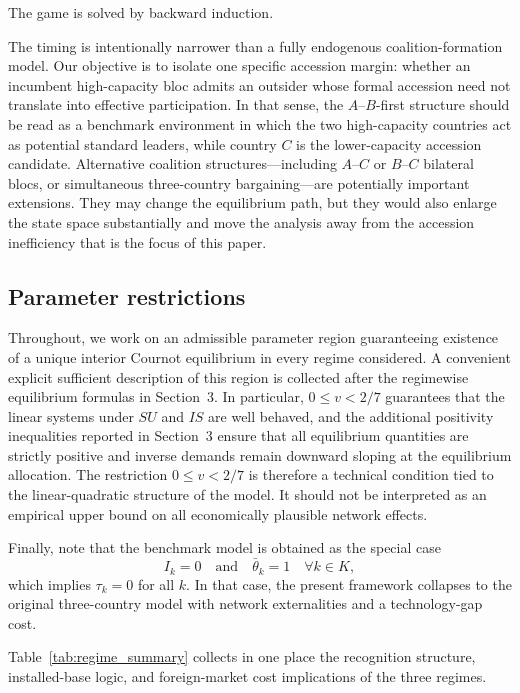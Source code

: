 The game is solved by backward induction.

The timing is intentionally narrower than a fully endogenous
coalition-formation model. Our objective is to isolate one specific accession
margin: whether an incumbent high-capacity bloc admits an outsider whose formal
accession need not translate into effective participation. In that sense, the
$A$--$B$-first structure should be read as a benchmark environment in which the
two high-capacity countries act as potential standard leaders, while country
$C$ is the lower-capacity accession candidate. Alternative coalition
structures---including $A$--$C$ or $B$--$C$ bilateral blocs, or simultaneous
three-country bargaining---are potentially important extensions. They may
change the equilibrium path, but they would also enlarge the state space
substantially and move the analysis away from the accession inefficiency that
is the focus of this paper.

\subsection{Parameter restrictions}

Throughout, we work on an admissible parameter region guaranteeing existence of
a unique interior Cournot equilibrium in every regime considered. A convenient
explicit sufficient description of this region is collected after the regimewise
equilibrium formulas in Section~3. In particular, $0\le v<2/7$ guarantees that
the linear systems under $SU$ and $IS$ are well behaved, and the additional
positivity inequalities reported in Section~3 ensure that all equilibrium
quantities are strictly positive and inverse demands remain downward sloping at
the equilibrium allocation. The restriction $0\le v<2/7$ is therefore a
technical condition tied to the linear-quadratic structure of the model. It
should not be interpreted as an empirical upper bound on all economically
plausible network effects.

Finally, note that the benchmark model is obtained as the special case
\[
I_k=0 \quad \text{and} \quad \bar\theta_k=1 \quad \forall k \in K,
\]
which implies $\tau_k=0$ for all $k$. In that case, the present framework collapses to the original three-country model with network externalities and a technology-gap cost.

Table~\ref{tab:regime_summary} collects in one place the recognition
structure, installed-base logic, and foreign-market cost implications of the
three regimes.

